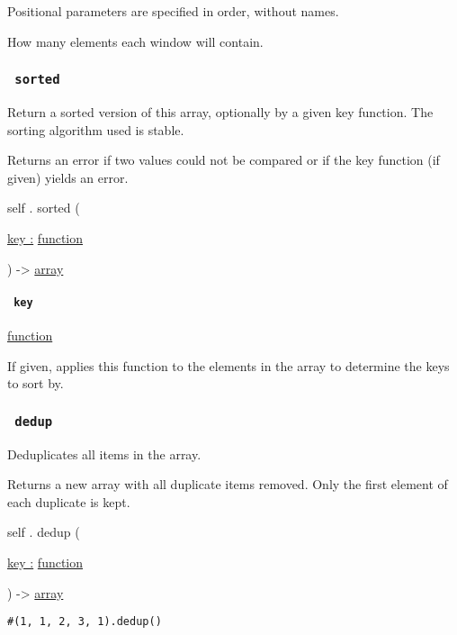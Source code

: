 \label{definitions-windows-window-size-positional-tooltip}
Positional parameters are specified in order, without names.

How many elements each window will contain.

\subsubsection{\texorpdfstring{\texttt{\ sorted\ }}{ sorted }}\label{definitions-sorted}

Return a sorted version of this array, optionally by a given key
function. The sorting algorithm used is stable.

Returns an error if two values could not be compared or if the key
function (if given) yields an error.

self { . } { sorted } (

{ \hyperref[definitions-sorted-parameters-key]{key :}
\href{/docs/reference/foundations/function/}{function} }

) -\textgreater{} \href{/docs/reference/foundations/array/}{array}

\paragraph{\texorpdfstring{\texttt{\ key\ }}{ key }}\label{definitions-sorted-key}

\href{/docs/reference/foundations/function/}{function}

If given, applies this function to the elements in the array to
determine the keys to sort by.

\subsubsection{\texorpdfstring{\texttt{\ dedup\ }}{ dedup }}\label{definitions-dedup}

Deduplicates all items in the array.

Returns a new array with all duplicate items removed. Only the first
element of each duplicate is kept.

self { . } { dedup } (

{ \hyperref[definitions-dedup-parameters-key]{key :}
\href{/docs/reference/foundations/function/}{function} }

) -\textgreater{} \href{/docs/reference/foundations/array/}{array}

\begin{verbatim}
#(1, 1, 2, 3, 1).dedup()
\end{verbatim}

